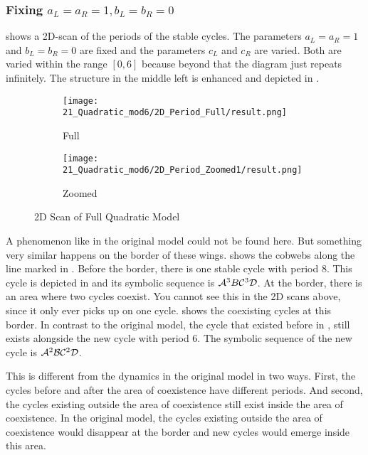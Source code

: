 \subsubsection{Fixing $a_L = a_R = 1, b_L = b_R = 0$}

 shows a 2D-scan of the periods of the stable cycles.
The parameters $a_L = a_R = 1$ and $b_L = b_R = 0$ are fixed and the parameters $c_L$ and $c_R$ are varied.
Both are varied within the range $[0, 6]$ because beyond that the diagram just repeats infinitely.
The structure in the middle left is enhanced and depicted in .

\begin{figure}
    \centering
    \begin{subfigure}{0.4\textwidth}
        \centering
        \texttt{[image: 21\_Quadratic\_mod6/2D\_Period\_Full/result.png]}
        \caption{Full}
        \label{fig:quadratic.full.2d.full}
    \end{subfigure}
    \begin{subfigure}{0.4\textwidth}
        \centering
        \texttt{[image: 21\_Quadratic\_mod6/2D\_Period\_Zoomed1/result.png]}
        \caption{Zoomed}
        \label{fig:quadratic.full.2d.z1}
    \end{subfigure}
    \caption{2D Scan of Full Quadratic Model}
\end{figure}

A phenomenon like in the original model could not be found here.
But something very similar happens on the border of these wings.
 shows the cobwebs along the line marked in .
Before the border, there is one stable cycle with period 8.
This cycle is depicted in  and its symbolic sequence is $\mathcal{A}^3B\mathcal{C}^3\mathcal{D}$.
At the border, there is an area where two cycles coexist.
You cannot see this in the 2D scans above, since it only ever picks up on one cycle.
 shows the coexisting cycles at this border.
In contrast to the original model, the cycle that existed before in , still exists alongside the new cycle with period 6.
The symbolic sequence of the new cycle is $\mathcal{A}^2\mathcal{B}\mathcal{C}^2\mathcal{D}$.

This is different from the dynamics in the original model in two ways.
First, the cycles before and after the area of coexistence have different periods.
And second, the cycles existing outside the area of coexistence still exist inside the area of coexistence.
In the original model, the cycles existing outside the area of coexistence would disappear at the border and new cycles would emerge inside this area.

